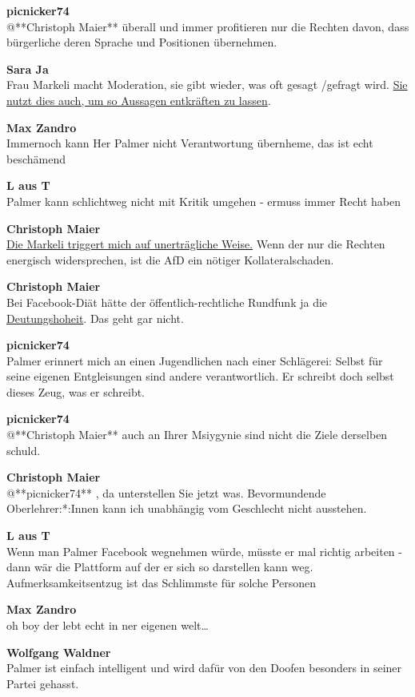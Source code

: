 \documentclass[]{article}
\begin{document}
\textbf{picnicker74}\\
​@**Christoph Maier** überall und immer profitieren nur die Rechten
davon, dass bürgerliche deren Sprache und Positionen übernehmen.

\textbf{Sara Ja}\\
​Frau Markeli macht Moderation, sie gibt wieder, was oft gesagt /gefragt
wird. \protect\hyperlink{timeout}{Sie nutzt dies auch, um so Aussagen
entkräften zu lassen}.

\textbf{Max Zandro}\\
​Immernoch kann Her Palmer nicht Verantwortung übernheme, das ist echt
beschämend

\textbf{L aus T}\\
​Palmer kann schlichtweg nicht mit Kritik umgehen - ermuss immer Recht
haben

\textbf{Christoph Maier}\\
​\protect\hyperlink{timeout}{Die Markeli triggert mich auf unerträgliche
Weise.} Wenn der nur die Rechten energisch widersprechen, ist die AfD
ein nötiger Kollateralschaden.

\textbf{Christoph Maier}\\
​Bei Facebook-Diät hätte der öffentlich-rechtliche Rundfunk ja die
\protect\hyperlink{Deutungshoheit}{Deutungshoheit}. Das geht gar nicht.

\textbf{picnicker74}\\
​Palmer erinnert mich an einen Jugendlichen nach einer Schlägerei:
Selbst für seine eigenen Entgleisungen sind andere verantwortlich. Er
schreibt doch selbst dieses Zeug, was er schreibt.

\textbf{picnicker74}\\
​@**Christoph Maier** auch an Ihrer Msiygynie sind nicht die Ziele
derselben schuld.

\textbf{Christoph Maier}\\
​@**picnicker74** , da unterstellen Sie jetzt was. Bevormundende
Oberlehrer:*:Innen kann ich unabhängig vom Geschlecht nicht ausstehen.

\textbf{L aus T}\\
​Wenn man Palmer Facebook wegnehmen würde, müsste er mal richtig
arbeiten - dann wär die Plattform auf der er sich so darstellen kann
weg. Aufmerksamkeitsentzug ist das Schlimmste für solche Personen

\textbf{Max Zandro}\\
​oh boy der lebt echt in ner eigenen welt\ldots{}

\textbf{Wolfgang Waldner}\\
​Palmer ist einfach intelligent und wird dafür von den Doofen besonders
in seiner Partei gehasst.
\end{document}
